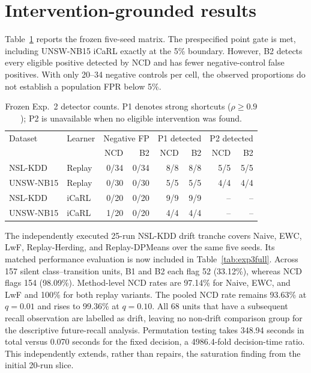\documentclass[10pt]{article}
\newcommand{\ncd}{\textsc{NCD}}
\begin{document}
\section{Intervention-grounded results}

Table~\ref{tab:exp2} reports the frozen five-seed matrix.  The prespecified
point gate is met, including UNSW-NB15 iCaRL exactly at the 5\% boundary.
However, B2 detects every eligible positive detected by \ncd{} and has fewer
negative-control false positives.  With only 20--34 negative controls per
cell, the observed proportions do not establish a population FPR below 5\%.

\begin{table}[ht]
\centering
\caption{Frozen Exp.~2 detector counts.  P1 denotes strong shortcuts
($\rho\geq0.9$); P2 is unavailable when no eligible intervention was found.}
\label{tab:exp2}
\small
\begin{tabular}{llrrrrrr}
\toprule
Dataset & Learner & \multicolumn{2}{c}{Negative FP} & \multicolumn{2}{c}{P1 detected} & \multicolumn{2}{c}{P2 detected} \\
 & & \ncd & B2 & \ncd & B2 & \ncd & B2 \\
\midrule
NSL-KDD & Replay & 0/34 & 0/34 & 8/8 & 8/8 & 5/5 & 5/5 \\
UNSW-NB15 & Replay & 0/30 & 0/30 & 5/5 & 5/5 & 4/4 & 4/4 \\
NSL-KDD & iCaRL & 0/20 & 0/20 & 9/9 & 9/9 & -- & -- \\
UNSW-NB15 & iCaRL & 1/20 & 0/20 & 4/4 & 4/4 & -- & -- \\
\bottomrule
\end{tabular}
\end{table}

The independently executed 25-run NSL-KDD drift tranche covers Naive, EWC,
LwF, Replay-Herding, and Replay-DPMeans over the same five seeds.  Its matched
performance evaluation is now included in Table~\ref{tab:exp3full}.  Across 157 silent
class--transition units, B1 and B2 each flag 52 (33.12\%), whereas \ncd{} flags
154 (98.09\%).  Method-level \ncd{} rates are 97.14\% for Naive, EWC, and LwF
and 100\% for both replay variants.  The pooled \ncd{} rate remains 93.63\% at
$q=0.01$ and rises to 99.36\% at $q=0.10$.  All 68 units that have a subsequent
recall observation are labelled as drift, leaving no non-drift comparison group
for the descriptive future-recall analysis.  Permutation testing takes
348.94 seconds in total versus 0.070 seconds for the fixed decision, a
4986.4-fold decision-time ratio.  This independently extends, rather than
repairs, the saturation finding from the initial 20-run slice.
\end{document}
